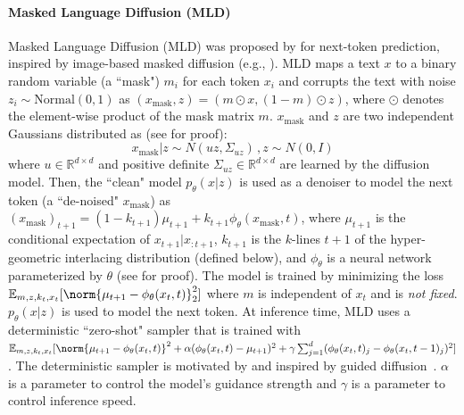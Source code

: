 \paragraph{Masked Language Diffusion (MLD)}
Masked Language Diffusion (MLD) was proposed by \citet{austin2023structured} for next-token prediction, inspired by image-based masked diffusion (e.g., \citet{dhariwal2021diffusionmodelsbeatgans}). MLD maps a text $x$ to a binary random variable (a ``mask") $m_i$ for each token $x_i$ and corrupts the text with noise $z_i \sim \mathrm{Normal(0,1)}$ as $(x_\mathrm{mask},z) = (m\odot x, (1-m)\odot z)$, where
$\odot$ denotes the element-wise product of the mask matrix $m$. $x_\mathrm{mask}$ and $z$ are two independent Gaussians distributed as (see \citet{austin2023structured} for proof):
\begin{equation}\label{eq:normal}
    x_\mathrm{mask} | z \sim N(uz, \Sigma_{uz})\,,
    z \sim N(0, I)
\end{equation}
where $u \in \mathbb{R}^{d\times d}$ and positive definite $\Sigma_{uz}\in \mathbb R^{d\times d}$ are learned by the diffusion model. Then, the ``clean" model $p_\theta(x|z)$ is used as a denoiser to model the next token (a ``de-noised" $x_\mathrm{mask}$) as $(x_\mathrm{mask})_{t+1} = (1-k_{t+1})\mu_{t+1} + k_{t+1}\phi_\theta(x_{\mathrm{mask}},t)$, where $\mu_{t+1}$ is the conditional expectation of $x_{t+1}|x_{:t+1}$, $k_{t+1}$ is the $k$-lines $t+1$ of the hyper-geometric interlacing distribution (defined below), and $\phi_\theta$ is a neural network parameterized by $\theta$ (see \citet{austin2023structured} for proof). The model is trained by minimizing the loss $\mathbb{E}_{m,z,k_t,x_t}[\norm{\mu_{t+1} - \phi_\theta(x_t, t)}_2^2]$ where $m$ is independent of $x_t$ and is \textit{not fixed}. $p_\theta(x|z)$ is used to model the next token. At inference time, MLD uses a deterministic ``zero-shot" sampler that is trained with $\mathbb{E}_{m,z,k_t,x_t}[\norm{\mu_{t+1} - \phi_\theta(x_t, t)}^2+\alpha(\phi_\theta(x_t, t)- \mu_{t+1})^2 + \gamma \sum_{j=1}^d (\phi_\theta(x_t, t)_j - \phi_\theta(x_t, t-1)_j)^2]$. 
The deterministic sampler is motivated by \citet{austin2023structured} and inspired by guided diffusion~\citep{dhariwal2021diffusionmodelsbeatgans}. $\alpha$ is a parameter to control the model's guidance strength and $\gamma$ is a parameter to control inference speed. 
